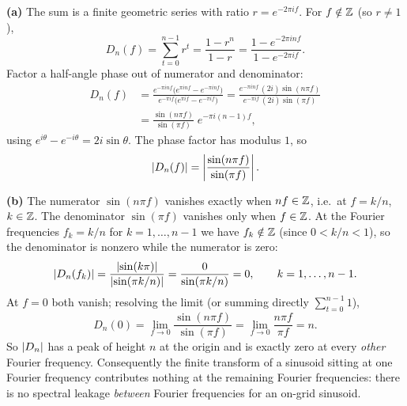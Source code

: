 \documentclass[11pt]{article}
\begin{document}
\textbf{(a)} The sum is a finite geometric series with ratio $r=e^{-2\pi i f}$. For $f\notin\mathbb{Z}$ (so $r\neq1$),
\[
D_n(f)=\sum_{t=0}^{n-1} r^{t}=\frac{1-r^{n}}{1-r}
=\frac{1-e^{-2\pi i n f}}{1-e^{-2\pi i f}} .
\]
Factor a half-angle phase out of numerator and denominator:
\[
\begin{aligned}
D_n(f)
&=\frac{e^{-\pi i n f}\bigl(e^{\pi i n f}-e^{-\pi i n f}\bigr)}
       {e^{-\pi i f}\bigl(e^{\pi i f}-e^{-\pi i f}\bigr)}
=\frac{e^{-\pi i n f}\,(2i)\sin(n\pi f)}{e^{-\pi i f}\,(2i)\sin(\pi f)}\\[2pt]
&=\frac{\sin(n\pi f)}{\sin(\pi f)}\;e^{-\pi i (n-1) f},
\end{aligned}
\]
using $e^{i\theta}-e^{-i\theta}=2i\sin\theta$. The phase factor has modulus $1$, so
\[
\left\lvert D_n(f) \right\rvert=\left\lvert\frac{\sin(n\pi f)}{\sin(\pi f)}\right\rvert .
\]

\textbf{(b)} The numerator $\sin(n\pi f)$ vanishes exactly when $n f\in\mathbb{Z}$, i.e.\ at $f=k/n$, $k\in\mathbb{Z}$. The denominator $\sin(\pi f)$ vanishes only when $f\in\mathbb{Z}$. At the Fourier frequencies $f_k=k/n$ for $k=1,\dots,n-1$ we have $f_k\notin\mathbb{Z}$ (since $0<k/n<1$), so the denominator is nonzero while the numerator is zero:
\[
\left\lvert D_n(f_k) \right\rvert=\frac{\left\lvert \sin(k\pi) \right\rvert}{\left\lvert \sin(\pi k/n) \right\rvert}=\frac{0}{\sin(\pi k/n)}=0,\qquad k=1,\dots,n-1.
\]
At $f=0$ both vanish; resolving the limit (or summing directly $\sum_{t=0}^{n-1}1$),
\[
D_n(0)=\lim_{f\to0}\frac{\sin(n\pi f)}{\sin(\pi f)}=\lim_{f\to0}\frac{n\pi f}{\pi f}=n .
\]
So $\left\lvert D_n \right\rvert$ has a peak of height $n$ at the origin and is exactly zero at every \emph{other} Fourier frequency. Consequently the finite transform of a sinusoid sitting at one Fourier frequency contributes nothing at the remaining Fourier frequencies: there is no spectral leakage \emph{between} Fourier frequencies for an on-grid sinusoid.
\end{document}
